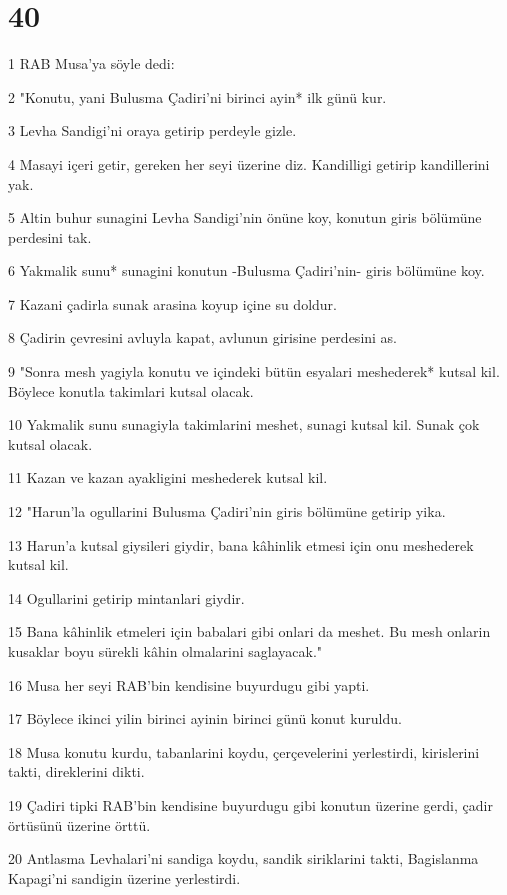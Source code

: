 \chapter{40}

\par 1 RAB Musa'ya söyle dedi:
\par 2 "Konutu, yani Bulusma Çadiri'ni birinci ayin* ilk günü kur.
\par 3 Levha Sandigi'ni oraya getirip perdeyle gizle.
\par 4 Masayi içeri getir, gereken her seyi üzerine diz. Kandilligi getirip kandillerini yak.
\par 5 Altin buhur sunagini Levha Sandigi'nin önüne koy, konutun giris bölümüne perdesini tak.
\par 6 Yakmalik sunu* sunagini konutun -Bulusma Çadiri'nin- giris bölümüne koy.
\par 7 Kazani çadirla sunak arasina koyup içine su doldur.
\par 8 Çadirin çevresini avluyla kapat, avlunun girisine perdesini as.
\par 9 "Sonra mesh yagiyla konutu ve içindeki bütün esyalari meshederek* kutsal kil. Böylece konutla takimlari kutsal olacak.
\par 10 Yakmalik sunu sunagiyla takimlarini meshet, sunagi kutsal kil. Sunak çok kutsal olacak.
\par 11 Kazan ve kazan ayakligini meshederek kutsal kil.
\par 12 "Harun'la ogullarini Bulusma Çadiri'nin giris bölümüne getirip yika.
\par 13 Harun'a kutsal giysileri giydir, bana kâhinlik etmesi için onu meshederek kutsal kil.
\par 14 Ogullarini getirip mintanlari giydir.
\par 15 Bana kâhinlik etmeleri için babalari gibi onlari da meshet. Bu mesh onlarin kusaklar boyu sürekli kâhin olmalarini saglayacak."
\par 16 Musa her seyi RAB'bin kendisine buyurdugu gibi yapti.
\par 17 Böylece ikinci yilin birinci ayinin birinci günü konut kuruldu.
\par 18 Musa konutu kurdu, tabanlarini koydu, çerçevelerini yerlestirdi, kirislerini takti, direklerini dikti.
\par 19 Çadiri tipki RAB'bin kendisine buyurdugu gibi konutun üzerine gerdi, çadir örtüsünü üzerine örttü.
\par 20 Antlasma Levhalari'ni sandiga koydu, sandik siriklarini takti, Bagislanma Kapagi'ni sandigin üzerine yerlestirdi.

